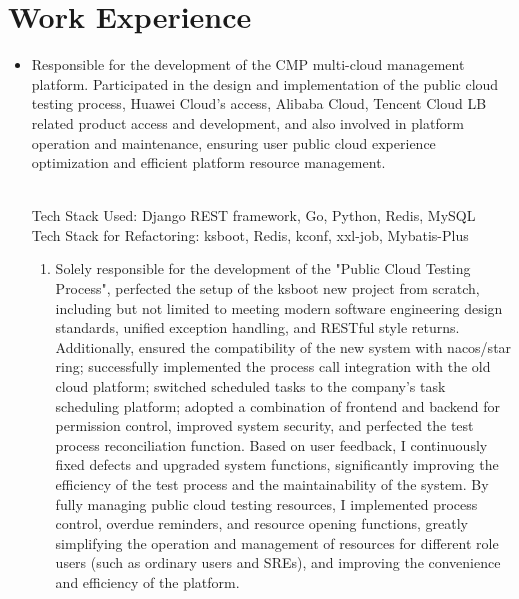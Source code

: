 \documentclass{resume}
\newcommand{\en}[1]{#1}
\newcommand{\zh}[1]{}
\begin{document}
\section{\en{Work Experience}\zh{工作经历}}
\en{}
\zh{\datedsubsection{\textbf{\href{https://www.kuaishou.com/about/}{快手，北京}}}{2022/12 -- 至今}}
\en{}
\zh{\rolewithdate{资源管理平台}{后端开发工程师}{2023/07 -- 至今}}
\begin{itemize}
      \item \en{Responsible for the development of the CMP multi-cloud management platform. Participated in the design and implementation of the public cloud testing process, Huawei Cloud's access, Alibaba Cloud, Tencent Cloud LB related product access and development, and also involved in platform operation and maintenance, ensuring user public cloud experience optimization and efficient platform resource management.}
            \zh{负责CMP多云管理平台的研发，期间参与公有云测试流程的设计与实现，华为云的接入，阿里云、腾讯云LB相关产品的接入与研发，同时参与平台运维，确保用户公有云体验优化与平台资源管理高效。}
            \en{\\Tech Stack Used: Django REST framework, Go, Python, Redis, MySQL\\}
            \zh{\\使用的技术栈: Django REST framework, Go, Python, Redis, MySQL\\}
            \en{Tech Stack for Refactoring: ksboot, Redis, kconf, xxl-job, Mybatis-Plus}
            \zh{重构使用的技术栈: ksboot, Redis, kconf, xxl-job, Mybatis-Plus}
            \begin{enumerate}
                  \item \en{Solely responsible for the development of the "Public Cloud Testing Process", perfected the setup of the ksboot new project from scratch, including but not limited to meeting modern software engineering design standards, unified exception handling, and RESTful style returns. Additionally, ensured the compatibility of the new system with nacos/star ring; successfully implemented the process call integration with the old cloud platform; switched scheduled tasks to the company's task scheduling platform; adopted a combination of frontend and backend for permission control, improved system security, and perfected the test process reconciliation function. Based on user feedback, I continuously fixed defects and upgraded system functions, significantly improving the efficiency of the test process and the maintainability of the system. By fully managing public cloud testing resources, I implemented process control, overdue reminders, and resource opening functions, greatly simplifying the operation and management of resources for different role users (such as ordinary users and SREs), and improving the convenience and efficiency of the platform.}

\end{enumerate}
\end{itemize}
\end{document}
